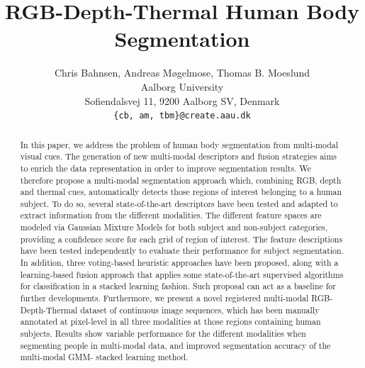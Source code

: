 \documentclass[10pt,twocolumn,letterpaper]{article}
\begin{document}
\title{RGB-Depth-Thermal Human Body Segmentation}

\author{Chris Bahnsen, Andreas Møgelmose, Thomas B. Moeslund\\
Aalborg University\\
Sofiendalsvej 11, 9200 Aalborg SV, Denmark\\
{\tt\small \{cb, am, tbm\}@create.aau.dk}
}

\maketitle

\begin{abstract}
In this paper, we address the problem of human body segmentation from multi-modal visual cues. The generation of new multi-modal descriptors and fusion strategies aims to enrich the data representation in order to improve segmentation results. We therefore propose a multi-modal segmentation approach which, combining RGB, depth and thermal cues, automatically detects those regions of interest belonging to a human subject. To do so, several state-of-the-art descriptors have been tested and adapted to extract information from the different modalities. The different feature spaces are modeled via Gaussian Mixture Models for both subject and non-subject categories, providing a confidence score for each grid of region of interest. The feature descriptions have been tested independently to evaluate their performance for subject segmentation. In addition, three voting-based heuristic approaches have been proposed, along with a learning-based fusion approach that applies some state-of-the-art supervised algorithms for classification in a stacked learning fashion. Such proposal can act as a baseline for further developments. Furthermore, we present a novel registered multi-modal RGB-Depth-Thermal dataset of continuous image sequences, which has been manually annotated at pixel-level in all three modalities at those regions containing human subjects. Results show variable performance for the different modalities when segmenting people in multi-modal data, and improved segmentation accuracy of the multi-modal GMM- stacked learning method.

\end{abstract}
\end{document}
